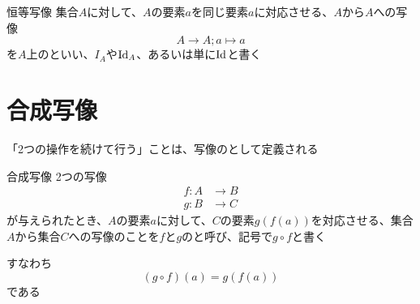 \documentclass[../../../topic_mapping]{subfiles}
\begin{document}
\begin{definition}{恒等写像}
  集合$A$に対して、$A$の要素$a$を同じ要素$a$に対応させる、$A$から$A$への写像
  \begin{equation*}
    A \to A; a \mapsto a
  \end{equation*}
  を$A$上のといい、$I_A$や$\operatorname{Id}_A$、あるいは単に$\operatorname{Id}$と書く
\end{definition}

\sectionline
\section{合成写像}

「2つの操作を続けて行う」ことは、写像のとして定義される

\begin{definition}{合成写像}
  2つの写像
  \begin{align*}
    f\colon A & \to B \\
    g\colon B & \to C
  \end{align*}
  が与えられたとき、$A$の要素$a$に対して、$C$の要素$g(f(a))$を対応させる、集合$A$から集合$C$への写像のことを$f$と$g$のと呼び、記号で$g \circ f$と書く

  すなわち
  \begin{equation*}
    (g \circ f)(a) = g(f(a))
  \end{equation*}
  である
\end{definition}
\end{document}
